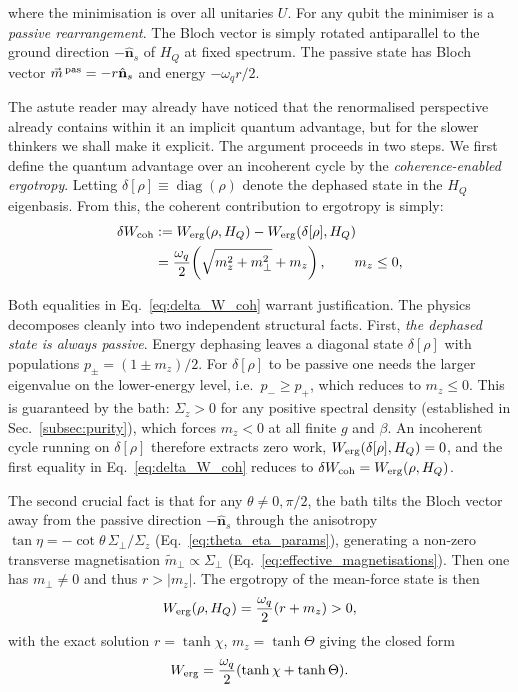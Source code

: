 where the minimisation is over all unitaries $U$.  For any qubit the
minimiser is a \emph{passive rearrangement}. The Bloch vector is simply rotated
antiparallel to the ground direction $-\hat{\mathbf{n}}_s$ of $H_Q$ at
fixed spectrum.  The passive state has Bloch vector $\vec{m}^{\,\rm pas}
= -r\hat{\mathbf{n}}_s$ and energy $-\omega_q r/2$.  

The astute reader may already have noticed that the renormalised perspective already contains within it an implicit quantum advantage, but for the slower thinkers we shall make it explicit. The argument proceeds in two steps. We first define the quantum advantage over an incoherent cycle by the \emph{coherence-enabled ergotropy}. Letting $\delta[\rho]\equiv\operatorname{diag}(\rho)$
denote the dephased state in the $H_Q$ eigenbasis. From this, the coherent contribution to ergotropy is simply:
\begin{equation}
\begin{split}
  \delta W_{\rm coh} &:= W_{\rm erg}(\rho,H_Q) - W_{\rm erg}(\delta[\rho],H_Q) \\
  &= \frac{\omega_q}{2}\!\left(\sqrt{m_z^2+m_\perp^2}+m_z\right), \qquad m_z\leq 0,
\end{split}
\label{eq:delta_W_coh}
\end{equation}

Both equalities in Eq.~\eqref{eq:delta_W_coh} warrant justification.
The physics decomposes cleanly into two independent structural facts. First, \emph{the dephased state is always passive}. Energy dephasing leaves a diagonal state $\delta[\rho]$ with populations
$p_\pm = (1\pm m_z)/2$.  For $\delta[\rho]$ to be passive one needs the
larger eigenvalue on the lower-energy level, i.e.\ $p_- \geq p_+$, which
reduces to $m_z \leq 0$.  This is guaranteed by the bath: $\Sigma_z > 0$
for any positive spectral density (established in Sec.~\ref{subsec:purity}),
which forces $m_z < 0$ at all finite $g$ and $\beta$.  An incoherent cycle
running on $\delta[\rho]$ therefore extracts zero work,
$W_{\rm erg}(\delta[\rho],H_Q)=0$, and the first equality in
Eq.~\eqref{eq:delta_W_coh} reduces to
$\delta W_{\rm coh} = W_{\rm erg}(\rho,H_Q)$.

The second crucial fact is that for any $\theta \neq 0, \pi/2$, the bath tilts the Bloch vector away from the passive direction $-\hat{\mathbf{n}}_s$ through the anisotropy
$\tan\eta=-\cot\theta\,\Sigma_\perp/\Sigma_z$
(Eq.~\eqref{eq:theta_eta_params}), generating a non-zero transverse
magnetisation $\tilde{m}_\perp\propto\Sigma_\perp$
(Eq.~\eqref{eq:effective_magnetisations}). Then one has $m_\perp\neq 0$ and thus
$r > |m_z|$.  The ergotropy of the mean-force state is then
\begin{equation}
  W_{\rm erg}(\rho,H_Q) = \frac{\omega_q}{2}(r + m_z) > 0,
  \label{eq:ergotropy_qubit}
\end{equation}
with the exact solution $r=\tanh\chi$, $m_z=\tanh\Theta$ giving the
closed form
\begin{equation}
  W_{\rm erg} = \frac{\omega_q}{2}(\tanh\chi + \tanh\Theta).
  \label{eq:ergotropy_exact}
\end{equation}

